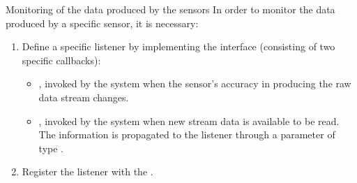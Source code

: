 \documentclass{beamer}
\begin{document}
  \begin{frame}{Monitoring of the data produced by the sensors}
    In order to monitor the data produced by a specific sensor, it is necessary:
    \begin{enumerate}\itemsep10pt
      \item Define a specific listener by implementing the
       interface (consisting of two specific
      callbacks):
      \begin{itemize}
        \item {}, invoked by the system when the
        sensor's accuracy in producing the raw data stream changes.
        \item {}, invoked by the system when new stream
        data is available to be read. The information is propagated to the
        listener through a parameter of type .
      \end{itemize}
      \item Register the listener with the .
    \end{enumerate}

  \end{frame}
\end{document}
